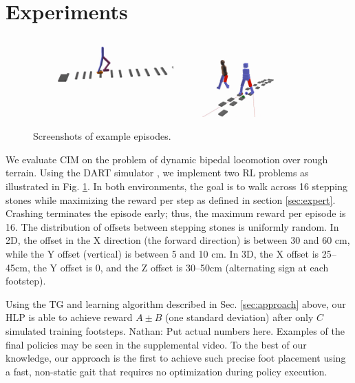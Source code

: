 \documentclass[conference]{IEEEtran}
\newcommand{\nhatch}[1]{{\leavevmode\color{magenta} Nathan: #1}}
\begin{document}
\section{Experiments}

\begin{figure}
  \includegraphics[width=0.48\textwidth]{../figures/2D_ep.png}
  \includegraphics[width=0.48\textwidth]{../figures/3D_ep.png}
  \caption{Screenshots of example episodes.\label{fig:example episodes}}
\end{figure}

We evaluate CIM on the problem of dynamic bipedal locomotion over rough terrain.
Using the DART simulator \citep{lee2018dart}, we implement two RL problems as illustrated in Fig. \ref{fig:example episodes}.
In both environments, the goal is to walk across 16 stepping stones while maximizing the reward per step as defined in section \ref{sec:expert}.
Crashing terminates the episode early;
thus, the maximum reward per episode is 16.
The distribution of offsets between stepping stones is uniformly random.
In 2D, the offset in the X direction (the forward direction) is between 30 and 60 cm, while the Y offset (vertical) is between 5 and 10 cm.
In 3D, the X offset is 25--45cm, the Y offset is 0, and the Z offset is 30--50cm (alternating sign at each footstep).

Using the TG and learning algorithm described in Sec. \ref{sec:approach} above, our HLP is able to achieve reward $A\pm B$ (one standard deviation) after only $C$ simulated training footsteps.
\nhatch{Put actual numbers here.}
Examples of the final policies may be seen in the supplemental video.
To the best of our knowledge, our approach is the first to achieve such precise foot placement
using a fast, non-static gait that requires no optimization during policy execution.
\end{document}
